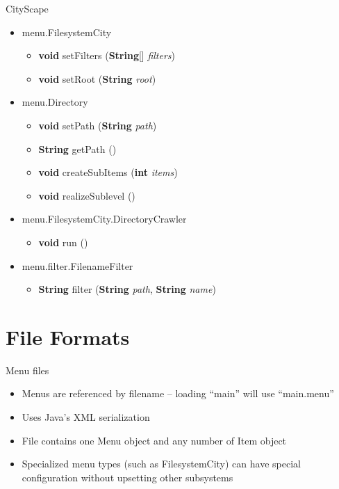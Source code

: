 \documentclass[style=smrt,mode=present,paper=screen]{powerdot}
\begin{document}
\begin{slide}{CityScape}
\begin{itemize}
\item menu.FilesystemCity
\begin{itemize}
	\item \textbf{void} setFilters (\textbf{String}[] \textit{filters})
	\item \textbf{void} setRoot (\textbf{String} \textit{root})
\end{itemize}
\item menu.Directory
\begin{itemize}
	\item \textbf{void} setPath (\textbf{String} \textit{path})
	\item \textbf{String} getPath ()
	\item \textbf{void} createSubItems (\textbf{int} \textit{items})
	\item \textbf{void} realizeSublevel ()
\end{itemize}
\item menu.FilesystemCity.DirectoryCrawler
\begin{itemize}
	\item \textbf{void} run ()
\end{itemize}
\item menu.filter.FilenameFilter
\begin{itemize}
	\item \textbf{String} filter (\textbf{String} \textit{path}, \textbf{String} \textit{name})
\end{itemize}
\end{itemize}
\end{slide}


\section{File Formats}

\begin{slide}{Menu files}
\begin{itemize}
	\item Menus are referenced by filename -- loading ``main'' will use ``main.menu''
	\item Uses Java's XML serialization
	\item File contains one Menu object and any number of Item object
	\item Specialized menu types (such as FilesystemCity) can have special
	      configuration without upsetting other subsystems
\end{itemize}
\end{slide}
\end{document}
